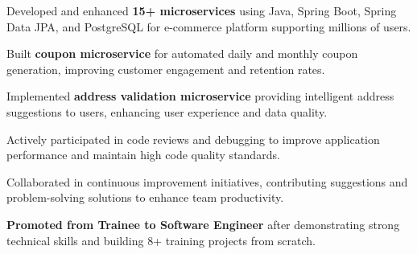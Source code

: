 \documentclass[]{deedy-resume-reversed}
\begin{document}
\begin{minipage}[t]{0.60\textwidth}
\begin{tightemize}
\item Developed and enhanced \textbf{15+ microservices} using Java, Spring Boot, Spring Data JPA, and PostgreSQL for e-commerce platform supporting millions of users.
\item Built \textbf{coupon microservice} for automated daily and monthly coupon generation, improving customer engagement and retention rates.
\item Implemented \textbf{address validation microservice} providing intelligent address suggestions to users, enhancing user experience and data quality.
\item Actively participated in code reviews and debugging to improve application performance and maintain high code quality standards.
\item Collaborated in continuous improvement initiatives, contributing suggestions and problem-solving solutions to enhance team productivity.
\item \textbf{Promoted from Trainee to Software Engineer} after demonstrating strong technical skills and building 8+ training projects from scratch.
\end{tightemize}
\sectionsep

%
%

\end{minipage}
\hfill
\end{document}
